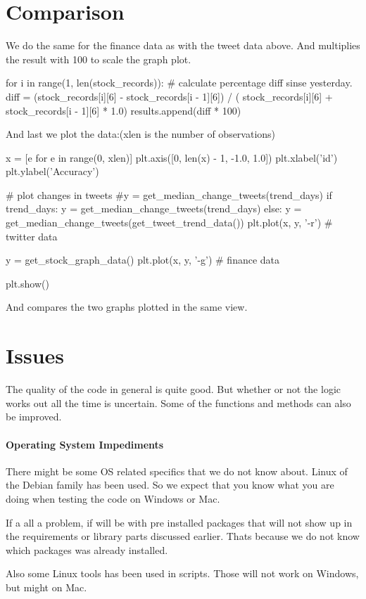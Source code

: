 \section{Comparison}\label{code:comparison}
We do the same for the finance data as with the tweet data above. And multiplies
the result with 100 to scale the graph plot.  
\begin{python}
for i in range(1, len(stock_records)):
    # calculate percentage diff sinse yesterday.
    diff = (stock_records[i][6] - stock_records[i - 1][6]) / (
        stock_records[i][6] + stock_records[i - 1][6] * 1.0)
    results.append(diff * 100)
\end{python}

And last we plot the data:(xlen is the number of observations) 
\begin{python}
x = [e for e in range(0, xlen)]
plt.axis([0, len(x) - 1, -1.0, 1.0])
plt.xlabel('id')
plt.ylabel('Accuracy')

# plot changes in tweets
#y = get_median_change_tweets(trend_days)
if trend_days:
    y = get_median_change_tweets(trend_days)
else:
    y = get_median_change_tweets(get_tweet_trend_data())
plt.plot(x, y, '-r')  # twitter data

y = get_stock_graph_data()
plt.plot(x, y, '-g')  # finance data

plt.show()
\end{python}

And compares the two graphs plotted in the same view. 
%
 
\section{Issues}\label{code:issues}
The  quality of the code in general is quite good. But whether or not the logic
works out all the time is uncertain. Some of the functions and methods can also
be improved.   

\paragraph{Operating System Impediments}
There might be some OS related specifics that we do not know about. Linux of
the Debian family has been used. So we expect that you know what you are doing
when testing the code on Windows or Mac.

If a all a problem, if will be with pre installed packages that will not
show up in the requirements or library parts discussed earlier. Thats because we
do not know which packages was already installed.  

Also some Linux tools has been used in scripts. Those will not work on Windows,
but might on Mac.
